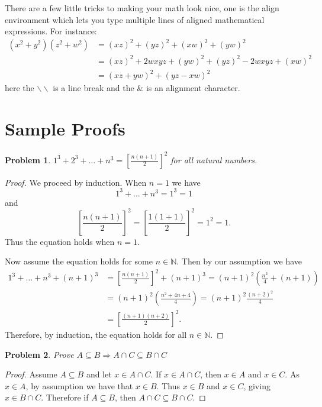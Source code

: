 \documentclass[12pt]{article}
\newcommand{\cont}{\subseteq}
\newtheorem{problem}{Problem}
\begin{document}
There are a few little tricks to making your math look nice, one is the align environment which lets you type multiple lines of aligned mathematical expressions. For instance:
\begin{align*}
(x^2+y^2)(z^2+w^2) & = (xz)^2 + (yz)^2 + (xw)^2 + (yw)^2 \\
& =  (xz)^2 + 2wxyz + (yw)^2 + (yz)^2 - 2 wxyz + (xw)^2 \\
&= (xz+yw)^2 + (yz-xw)^2
\end{align*}
here the $\backslash\backslash$ is a line break and the $\&$ is an alignment character. 
\section{Sample Proofs}
\begin{problem} $1^3+2^3+\ldots +n^3 = \left[ \frac{n(n+1)}{2}\right]^2$  for all natural numbers. 

\end{problem}
 
\begin{proof}
We proceed by induction. When $n=1$ we have 
$$
1^3 + \ldots + n^3 = 1^3 =1
$$
and
$$
\left[ \frac{n(n+1)}{2}\right]^2=\left[ \frac{1(1+1)}{2}\right]^2 = 1^2 =1.
$$
Thus the equation holds when $n=1$.

Now assume the equation holds for some $n \in \mathbb N$. Then by our assumption we have
\begin{align*}
1^3 + \ldots + n^3 + (n+1)^3& =   \left[ \frac{n(n+1)}{2}\right]^2 + (n+1)^3 = (n+1)^2\left( \frac{n^2}{4} + (n+1)\right) \\
&=(n+1)^2\left( \frac{n^2+4n+4}{4} \right) = (n+1)^2\frac{(n+2)^2}{4}  \\ &=  \left[ \frac{(n+1)(n+2)}{2}\right]^2.
\end{align*}
Therefore, by induction, the equation holds for all $n\in \mathbb N$.
\end{proof}

\begin{problem} Prove $A \subseteq B \Rightarrow A \cap C \cont B \cap C$
\end{problem}
\begin{proof} Assume $A \cont B $ and let $x\in A \cap C$. If $x \in  A \cap C$, then $x\in A$ and $x \in C$. As $x\in A$, by assumption we have that $x \in B$. Thus $x \in B$ and $x \in C$, giving $x\in B \cap C$. Therefore if $A \subseteq B $, then $A \cap C \cont B \cap C$.
\end{proof}

 
\end{document}
